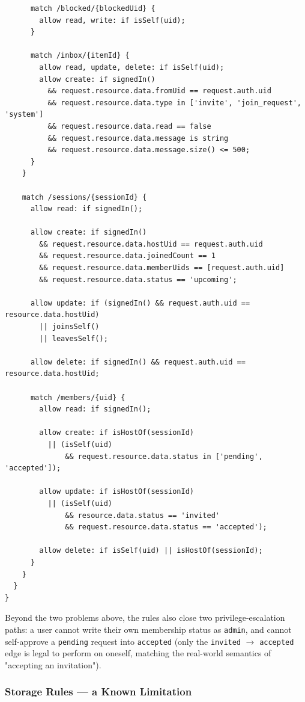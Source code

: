 \begin{verbatim}
      match /blocked/{blockedUid} {
        allow read, write: if isSelf(uid);
      }

      match /inbox/{itemId} {
        allow read, update, delete: if isSelf(uid);
        allow create: if signedIn()
          && request.resource.data.fromUid == request.auth.uid
          && request.resource.data.type in ['invite', 'join_request', 'system']
          && request.resource.data.read == false
          && request.resource.data.message is string
          && request.resource.data.message.size() <= 500;
      }
    }

    match /sessions/{sessionId} {
      allow read: if signedIn();

      allow create: if signedIn()
        && request.resource.data.hostUid == request.auth.uid
        && request.resource.data.joinedCount == 1
        && request.resource.data.memberUids == [request.auth.uid]
        && request.resource.data.status == 'upcoming';

      allow update: if (signedIn() && request.auth.uid == resource.data.hostUid)
        || joinsSelf()
        || leavesSelf();

      allow delete: if signedIn() && request.auth.uid == resource.data.hostUid;

      match /members/{uid} {
        allow read: if signedIn();

        allow create: if isHostOf(sessionId)
          || (isSelf(uid)
              && request.resource.data.status in ['pending', 'accepted']);

        allow update: if isHostOf(sessionId)
          || (isSelf(uid)
              && resource.data.status == 'invited'
              && request.resource.data.status == 'accepted');

        allow delete: if isSelf(uid) || isHostOf(sessionId);
      }
    }
  }
}
\end{verbatim}

Beyond the two problems above, the rules also close two privilege-escalation paths: a user cannot write their own membership status as \texttt{admin}, and cannot self-approve a \texttt{pending} request into \texttt{accepted} (only the \texttt{invited} $\to$ \texttt{accepted} edge is legal to perform on oneself, matching the real-world semantics of "accepting an invitation").

\subsubsection{Storage Rules — a Known Limitation}

